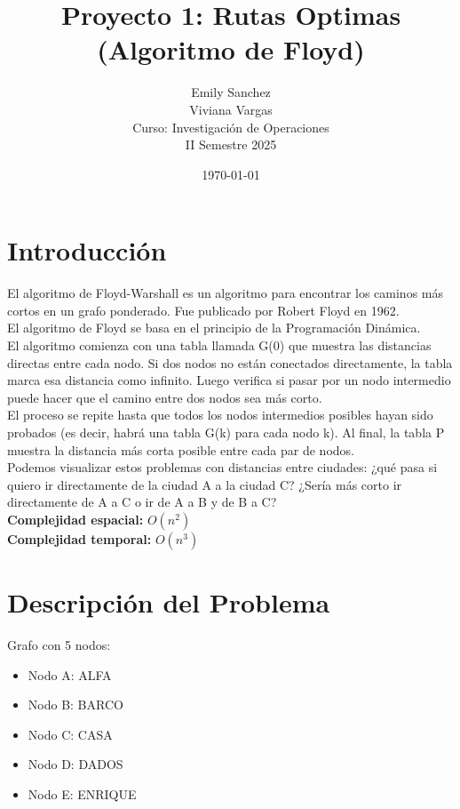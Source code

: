 \documentclass[12pt]{article}
\title{Proyecto 1: Rutas Optimas (Algoritmo de Floyd)}
\author{Emily Sanchez \\ Viviana Vargas \\[1cm] Curso: Investigación de Operaciones \\ II Semestre 2025}
\date{\today}
\begin{document}
\maketitle
\thispagestyle{empty}
\newpage
\setcounter{page}{1}

\section{Introducción}
El algoritmo de Floyd-Warshall es un algoritmo para encontrar los caminos más cortos en un grafo ponderado. Fue publicado por Robert Floyd en 1962.\\
El algoritmo de Floyd se basa en el principio de la Programación Dinámica.\\
El algoritmo comienza con una tabla llamada G(0) que muestra las distancias directas entre cada nodo. Si dos nodos no están conectados directamente, la tabla marca esa distancia como infinito. Luego verifica si pasar por un nodo intermedio puede hacer que el camino entre dos nodos sea más corto.\\
El proceso se repite hasta que todos los nodos intermedios posibles hayan sido probados (es decir, habrá una tabla G(k) para cada nodo k). Al final, la tabla P muestra la distancia más corta posible entre cada par de nodos.\\
Podemos visualizar estos problemas con distancias entre ciudades: ¿qué pasa si quiero ir directamente de la ciudad A a la ciudad C? ¿Sería más corto ir directamente de A a C o ir de A a B y de B a C?\\
\textbf{Complejidad espacial:} $O(n^2)$\\
\textbf{Complejidad temporal:} $O(n^3)$\\
\clearpage
\section{Descripción del Problema}
Grafo con 5 nodos:

\begin{itemize}
\item Nodo A: ALFA
\item Nodo B: BARCO
\item Nodo C: CASA
\item Nodo D: DADOS
\item Nodo E: ENRIQUE
\end{itemize}
\end{document}
